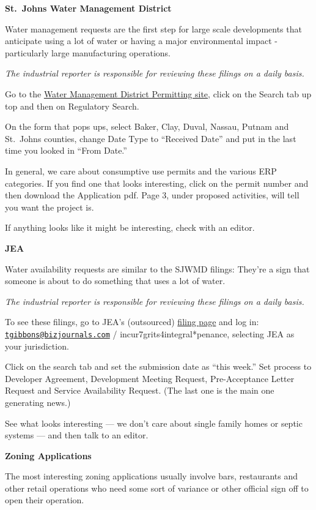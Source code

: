 \documentclass[
  11pt,
  american,
  letterpaperpaper,
  extrafontsizes,onecolumn,openright
  ]{memoir}
\begin{document}
\textbf{St.~Johns Water Management District}

Water management requests are the first step for large scale developments that anticipate using a lot of water or having a major environmental impact - particularly large manufacturing operations.

\emph{The industrial reporter is responsible for reviewing these filings on a daily basis.}

Go to the \href{https://permitting.sjrwmd.com/ep/\#/ep}{Water Management District Permitting site}, click on the Search tab up top and then on Regulatory Search.

On the form that pops ups, select Baker, Clay, Duval, Nassau, Putnam and St.~Johns counties, change Date Type to \enquote{Received Date} and put in the last time you looked in \enquote{From Date.}

In general, we care about consumptive use permits and the various ERP categories. If you find one that looks interesting, click on the permit number and then download the Application pdf. Page 3, under proposed activities, will tell you want the project is.

If anything looks like it might be interesting, check with an editor.

\textbf{JEA}

Water availability requests are similar to the SJWMD filings: They're a sign that someone is about to do something that uses a lot of water.

\emph{The industrial reporter is responsible for reviewing these filings on a daily basis.}

To see these filings, go to JEA's (outsourced) \href{https://www.sagesgov.com/Home/Search.aspx}{filing page} and log in: \href{mailto:tgibbons@bizjournals.com}{\nolinkurl{tgibbons@bizjournals.com}} / incur7grits4integral*penance, selecting JEA as your jurisdiction.

Click on the search tab and set the submission date as \enquote{this week.} Set process to Developer Agreement, Development Meeting Request, Pre-Acceptance Letter Request and Service Availability Request. (The last one is the main one generating news.)

See what looks interesting --- we don't care about single family homes or septic systems --- and then talk to an editor.

\textbf{Zoning Applications}

The most interesting zoning applications usually involve bars, restaurants and other retail operations who need some sort of variance or other official sign off to open their operation.
\end{document}
